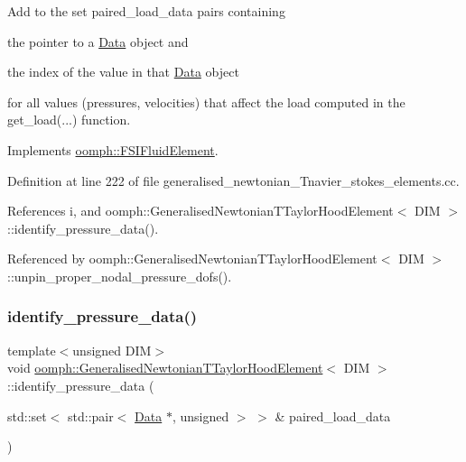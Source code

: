 Add to the set {\ttfamily paired\+\_\+load\+\_\+data} pairs containing
\begin{DoxyItemize}
\item the pointer to a \hyperlink{classoomph_1_1Data}{Data} object and
\item the index of the value in that \hyperlink{classoomph_1_1Data}{Data} object
\end{DoxyItemize}for all values (pressures, velocities) that affect the load computed in the {\ttfamily get\+\_\+load}(...) function. 

Implements \hyperlink{classoomph_1_1FSIFluidElement_a13c5f835cddd1b78e6d2582733619300}{oomph\+::\+F\+S\+I\+Fluid\+Element}.



Definition at line 222 of file generalised\+\_\+newtonian\+\_\+\+Tnavier\+\_\+stokes\+\_\+elements.\+cc.



References i, and oomph\+::\+Generalised\+Newtonian\+T\+Taylor\+Hood\+Element$<$ D\+I\+M $>$\+::identify\+\_\+pressure\+\_\+data().



Referenced by oomph\+::\+Generalised\+Newtonian\+T\+Taylor\+Hood\+Element$<$ D\+I\+M $>$\+::unpin\+\_\+proper\+\_\+nodal\+\_\+pressure\+\_\+dofs().

\mbox{\label{classoomph_1_1GeneralisedNewtonianTTaylorHoodElement_a9dba8c6c24e6105d289590f0b3ac0a40}} 
\subsubsection{\texorpdfstring{identify\+\_\+pressure\+\_\+data()}{identify\_pressure\_data()}}
{\footnotesize\ttfamily template$<$unsigned D\+IM$>$ \\
void \hyperlink{classoomph_1_1GeneralisedNewtonianTTaylorHoodElement}{oomph\+::\+Generalised\+Newtonian\+T\+Taylor\+Hood\+Element}$<$ D\+IM $>$\+::identify\+\_\+pressure\+\_\+data (\begin{DoxyParamCaption}\item[{std\+::set$<$ std\+::pair$<$ \hyperlink{classoomph_1_1Data}{Data} $\ast$, unsigned $>$ $>$ \&}]{paired\+\_\+load\+\_\+data }\end{DoxyParamCaption})\hspace{0.3cm}{\ttfamily [virtual]}}



